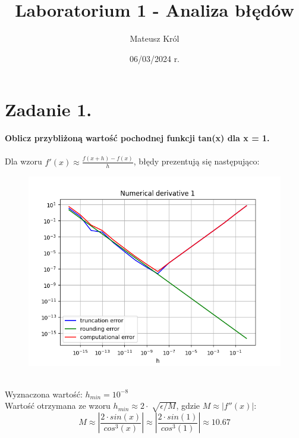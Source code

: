 \documentclass{article}
\title{Laboratorium 1 - Analiza błędów}
\author{Mateusz Król}
\date{06/03/2024 r.}
\begin{document}
\maketitle


\section*{Zadanie 1.}
\textbf{Oblicz przybliżoną wartość pochodnej funkcji tan(x) dla x = 1.} 
\\\\
Dla wzoru $f'(x)\approx\frac{f(x+h)-f(x)}{h}$, błędy prezentują się następująco:
\begin{figure}[ht!]
\includegraphics[width=\linewidth]{figures/numerical_derivative_1.png}
\end{figure}
\\

Wyznaczona wartość: $h_{min} = 10^{-8}$ \\
Wartość otrzymana ze wzoru $h_{min} \approx 2\cdot\sqrt[]{\epsilon/M}$,
gdzie $M \approx \left|f''(x)\right|$: \\
$$M\approx \left|\frac{2 \cdot sin(x)}{cos^{3}(x)}\right|
\approx \left|\frac{2 \cdot sin(1)}{cos^{3}(1)}\right|
\approx 10.67$$
\end{document}
